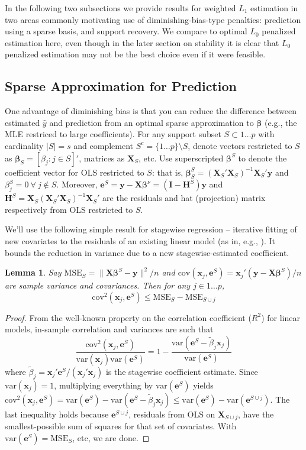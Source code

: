 \documentclass[12pt]{article}
\newtheorem{lemma}{\sc Lemma}[section]
\newcommand{\bs}[1]{\boldsymbol{#1}}
\newcommand{\mr}[1]{\mathrm{#1}}
\newcommand{\bm}[1]{\mathbf{#1}}
\begin{document}
In the following two subsections we provide results for weighted $L_1$ estimation in two areas commonly motivating use of diminishing-bias-type penalties: prediction using a sparse basis, and support recovery.  We compare to optimal $L_0$ penalized estimation here, even though in the later section on stability it is clear that $L_0$ penalized estimation may not be the best choice even if it were feasible.


\subsection{Sparse Approximation for Prediction}

One advantage of diminishing bias is that you can reduce the difference between estimated $\hat y$ and prediction from an optimal sparse approximation to
$\bs{\beta}$ (e.g., the MLE restriced to large coefficients).  For any support subset $S \subset 1\ldots p$ with cardinality $|S|=s$ and complement $S^c = \{1\ldots p\}\setminus S$, denote vectors
restricted to $S$ as $\bm{\beta}_S = [\beta_j:j\in S]'$, matrices as $\bm{X}_S$, etc.  Use superscripted $\bs{\beta}^S$ to denote the coefficient vector for OLS restricted to $S$: that is, $\bs{\beta}^S_S = (\bm{X}_S'\bm{X}_S)^{-1}\bm{X}_S'\bm{y}$ and $\beta^{S}_j = 0~\forall~j\notin S$.  Moreover, 
$\bm{e}^S = \bm{y}-\bm{X}\bs{\beta}^\nu = (\bm{I}-\bm{H}^S)\bm{y}$ and 
$\bm{H}^S = \bm{X}_S(\bm{X}_S'\bm{X}_S)^{-1}\bm{X}_S'$ are the residuals and hat (projection) matrix respectively from OLS restricted to $S$.

We'll use the following simple result for stagewise regression -- iterative fitting of new covariates to the residuals of an existing linear model (as in, e.g., \citealt{goldberger_stepwise_1961}). It bounds the reduction in variance due to a new stagewise-estimated coefficient.
\begin{lemma}\label{SSElemma}
Say $\mr{MSE}_S = \|\bm{X}\bs{\beta}^S-\bm{y}\|^2/n$ and 
$\mr{cov}(\bs{x}_j,\bm{e}^S) = \bs{x}_j'(\bm{y}-\bm{X}\bs{\beta}^S)/n$ are sample variance and covariances.  Then for any $j \in 1\ldots p$, 
\[
\mr{cov}^2(\bs{x}_j,\bm{e}^S) \leq \mr{MSE}_S - \mr{MSE}_{S\cup j}
\]
\end{lemma}
\begin{proof}
From the well-known property on the correlation coefficient ($R^2$) for linear models,   
in-sample correlation and variances are such that
\[
\frac{\mr{cov}^2(\bs{x}_j,\bm{e}^S)}{\mr{var}(\bs{x}_j)\mr{var}(\bm{e}^S)} = 1 - \frac{\mr{var}(\bm{e}^S-\tilde\beta_j\bs{x}_j)}{\mr{var}(\bm{e}^S)}
\]
where $\tilde\beta_j = \bs{x}_j'\bm{e}^S/(\bs{x}_j'\bs{x}_j)$ is the stagewise coefficient estimate.  Since $\mr{var}(\bs{x}_j)=1$, multiplying everything by $\mr{var}(\bm{e}^S)$ yields $\mr{cov}^2(\bs{x}_j,\bm{e}^S) =
\mr{var}(\bm{e}^S) - \mr{var}(\bm{e}^S-\tilde\beta_j\bs{x}_j)
\leq \mr{var}(\bm{e}^S) - \mr{var}(\bm{e}^{S\cup j})$.
The last inequality holds because $\bm{e}^{S\cup j}$, residuals from OLS on $\bm{X}_{S\cup j}$, have the smallest-possible sum of squares for that set of covariates.  With $\mr{var}(\bm{e}^S) = \mr{MSE}_S$, etc, we are done.
\end{proof}
\end{document}
